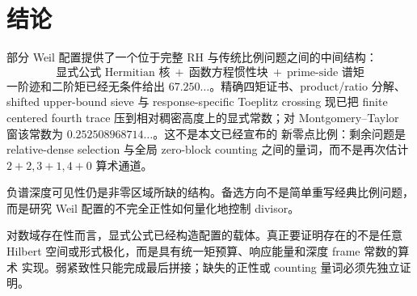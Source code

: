 \documentclass[UTF8,11pt,a4paper]{ctexart}
\theoremstyle{definition}
\theoremstyle{remark}
\begin{document}
\section{结论}

部分 Weil 配置提供了一个位于完整 RH 与传统比例问题之间的中间结构：
\[
\boxed{\text{显式公式 Hermitian 核}
\ +\ \text{函数方程惯性块}
\ +\ \text{prime-side 谱矩}}
\]
一阶迹和二阶矩已经无条件给出 $67.250\ldots$。精确四矩证书、product/ratio
分解、shifted upper-bound sieve 与 response-specific Toeplitz crossing
现已把 finite centered fourth trace 压到相对稠密高度上的显式常数；对
Montgomery--Taylor 窗该常数为 $0.252508968714\ldots$。这不是本文已经宣布的
新零点比例：剩余问题是 relative-dense selection 与全局 zero-block counting
之间的量词，而不是再次估计 $2+2,3+1,4+0$ 算术通道。

负谱深度可见性仍是非零区域所缺的结构。备选方向不是简单重写经典比例问题，
而是研究 Weil 配置的不完全正性如何量化地控制 divisor。

对数域存在性而言，显式公式已经构造配置的载体。真正要证明存在的不是任意
Hilbert 空间或形式极化，而是具有统一矩预算、响应能量和深度 frame 常数的算术
实现。弱紧致性只能完成最后拼接；缺失的正性或 counting 量词必须先独立证明。
\end{document}
